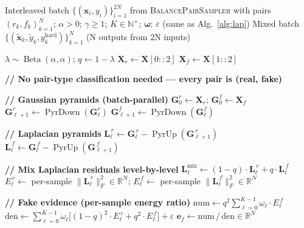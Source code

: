 \documentclass[12pt]{article}
\begin{document}
\clearpage
\begin{algorithm}[p]
\caption{RFPairLapPyramidMixup \quad (v2 sampler, RF-only)}
\label{alg:rf_lap}
\begin{algorithmic}[1]\scriptsize
\Require
  Interleaved batch $\{(\mathbf{x}_i, y_i)\}_{i=1}^{2N}$ from \textsc{BalancePairSampler}
  with pairs $(r_k, f_k)_{k=1}^{N}$;
  $\alpha > 0$; $\gamma \ge 1$; $K \in \mathbb{N}^+$; $\bm{\omega}$; $\varepsilon$ (same as Alg.~\ref{alg:lap})
\Ensure
  Mixed batch $\{(\tilde{\mathbf{x}}_k, \tilde{y}_k, y^{\text{hard}}_k)\}_{k=1}^{N}$ (N outputs from 2N inputs)

\State $\lambda \sim \operatorname{Beta}(\alpha, \alpha)$; \quad $q \gets 1 - \lambda$
\State $\mathbf{X}_r \gets \mathbf{X}[0::2]$ 
\State $\mathbf{X}_f \gets \mathbf{X}[1::2]$ 

\State \textbf{// No pair-type classification needed — every pair is (real, fake)}

\State \textbf{// Gaussian pyramids (batch-parallel)}
\State $\mathbf{G}_0^r \gets \mathbf{X}_r$; \quad $\mathbf{G}_0^f \gets \mathbf{X}_f$
  \State $\mathbf{G}_{\ell+1}^r \gets \operatorname{PyrDown}(\mathbf{G}_\ell^r)$
  \State $\mathbf{G}_{\ell+1}^f \gets \operatorname{PyrDown}(\mathbf{G}_\ell^f)$
\EndFor

\State \textbf{// Laplacian pyramids}
  \State $\mathbf{L}_\ell^{\,r} \gets \mathbf{G}_\ell^{\,r} - \operatorname{PyrUp}(\mathbf{G}_{\ell+1}^{\,r})$
  \State $\mathbf{L}_\ell^{\,f} \gets \mathbf{G}_\ell^{\,f} - \operatorname{PyrUp}(\mathbf{G}_{\ell+1}^{\,f})$
\EndFor

\State \textbf{// Mix Laplacian residuals level-by-level}
  \State $\mathbf{L}_\ell^{\text{mix}} \gets (1 - q) \cdot \mathbf{L}_\ell^{\,r} + q \cdot \mathbf{L}_\ell^{\,f}$
  \State $E_\ell^{\,r} \gets$ per-sample $\|\mathbf{L}_\ell^{\,r}\|_F^2 \in \mathbb{R}^{N}$; \quad
        $E_\ell^{\,f} \gets$ per-sample $\|\mathbf{L}_\ell^{\,f}\|_F^2 \in \mathbb{R}^{N}$
\EndFor

\State \textbf{// Fake evidence (per-sample energy ratio)}
\State $\text{num} \gets q^2 \sum_{\ell=0}^{K-1} \omega_\ell \cdot E_\ell^{\,f}$
\State $\text{den} \gets \sum_{\ell=0}^{K-1} \omega_\ell\big[(1-q)^2 \cdot E_\ell^{\,r} + q^2 \cdot E_\ell^{\,f}\big] + \varepsilon$
\State $\mathbf{e}_f \gets \text{num} \,/\, \text{den} \in \mathbb{R}^{N}$


\end{algorithmic}
\end{algorithm}
\end{document}

